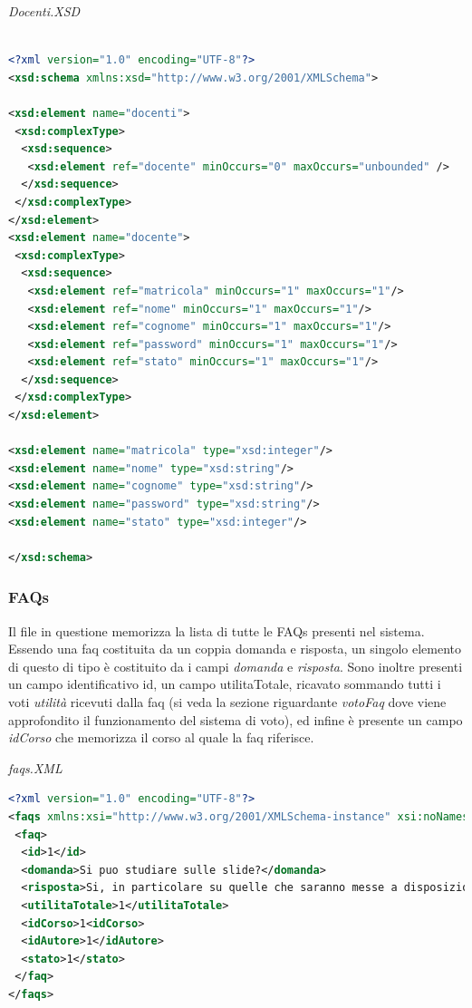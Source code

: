 \documentclass [a4paper,11pt]{book}
\begin{document}
\medskip

\emph{Docenti.XSD}

\begin{lstlisting}[language=XML]

<?xml version="1.0" encoding="UTF-8"?>
<xsd:schema xmlns:xsd="http://www.w3.org/2001/XMLSchema">

<xsd:element name="docenti">
 <xsd:complexType>
  <xsd:sequence>
   <xsd:element ref="docente" minOccurs="0" maxOccurs="unbounded" />
  </xsd:sequence>
 </xsd:complexType>
</xsd:element>
<xsd:element name="docente">
 <xsd:complexType>
  <xsd:sequence>
   <xsd:element ref="matricola" minOccurs="1" maxOccurs="1"/>
   <xsd:element ref="nome" minOccurs="1" maxOccurs="1"/>
   <xsd:element ref="cognome" minOccurs="1" maxOccurs="1"/>
   <xsd:element ref="password" minOccurs="1" maxOccurs="1"/>
   <xsd:element ref="stato" minOccurs="1" maxOccurs="1"/>
  </xsd:sequence>
 </xsd:complexType>
</xsd:element>

<xsd:element name="matricola" type="xsd:integer"/>
<xsd:element name="nome" type="xsd:string"/>
<xsd:element name="cognome" type="xsd:string"/>
<xsd:element name="password" type="xsd:string"/>
<xsd:element name="stato" type="xsd:integer"/>
  
</xsd:schema>
\end{lstlisting}

\medskip

\subsubsection{FAQs}	%

Il file in questione memorizza la lista di tutte le FAQs presenti nel sistema. Essendo una faq costituita da un coppia domanda e risposta, un singolo elemento di questo di tipo è costituito da i campi \emph{domanda} e \emph{risposta}. Sono inoltre presenti un campo identificativo id, un campo utilitaTotale, ricavato sommando tutti i voti \emph{utilità} ricevuti dalla faq (si veda la sezione riguardante \emph{votoFaq} dove viene approfondito il funzionamento del sistema di voto), ed infine è presente un campo \emph{idCorso} che memorizza il corso al quale la faq riferisce.

\medskip

\emph{faqs.XML}

\label{sec:faqs}

\begin{lstlisting}[language=XML]
<?xml version="1.0" encoding="UTF-8"?>
<faqs xmlns:xsi="http://www.w3.org/2001/XMLSchema-instance" xsi:noNamespaceSchemaLocation="faqs.xsd">
 <faq>
  <id>1</id>
  <domanda>Si puo studiare sulle slide?</domanda>
  <risposta>Si, in particolare su quelle che saranno messe a disposizione durante il corso</risposta>
  <utilitaTotale>1</utilitaTotale>
  <idCorso>1<idCorso>
  <idAutore>1</idAutore>
  <stato>1</stato>
 </faq>
</faqs>
\end{lstlisting}
\end{document}
